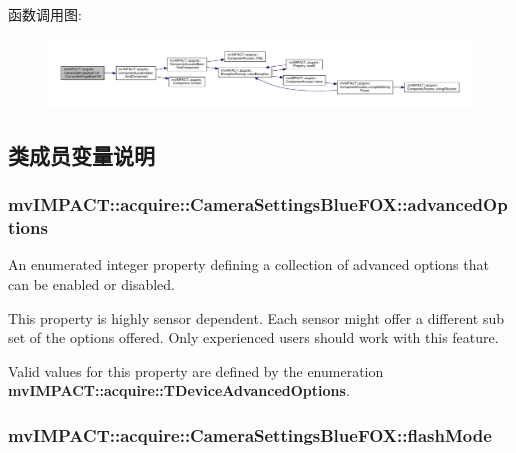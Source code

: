 函数调用图\+:
\nopagebreak
\begin{figure}[H]
\begin{center}
\leavevmode
\includegraphics[width=350pt]{classmv_i_m_p_a_c_t_1_1acquire_1_1_camera_settings_blue_f_o_x_acd1731450b9b16c03b4de2748a00d801_cgraph}
\end{center}
\end{figure}




\subsection{类成员变量说明}
\hypertarget{classmv_i_m_p_a_c_t_1_1acquire_1_1_camera_settings_blue_f_o_x_ab121de32a400194b4313fbadfa3abf01}{
\subsubsection[{advanced\+Options}]{ mv\+I\+M\+P\+A\+C\+T\+::acquire\+::\+Camera\+Settings\+Blue\+F\+O\+X\+::advanced\+Options}}\label{classmv_i_m_p_a_c_t_1_1acquire_1_1_camera_settings_blue_f_o_x_ab121de32a400194b4313fbadfa3abf01}


An enumerated integer property defining a collection of advanced options that can be enabled or disabled. 

This property is highly sensor dependent. Each sensor might offer a different sub set of the options offered. Only experienced users should work with this feature.

Valid values for this property are defined by the enumeration {\bfseries mv\+I\+M\+P\+A\+C\+T\+::acquire\+::\+T\+Device\+Advanced\+Options}. \hypertarget{classmv_i_m_p_a_c_t_1_1acquire_1_1_camera_settings_blue_f_o_x_a5313c4dc12dd4b6bd30a2dbaef0f8436}{
\subsubsection[{flash\+Mode}]{ mv\+I\+M\+P\+A\+C\+T\+::acquire\+::\+Camera\+Settings\+Blue\+F\+O\+X\+::flash\+Mode}}\label{classmv_i_m_p_a_c_t_1_1acquire_1_1_camera_settings_blue_f_o_x_a5313c4dc12dd4b6bd30a2dbaef0f8436}


